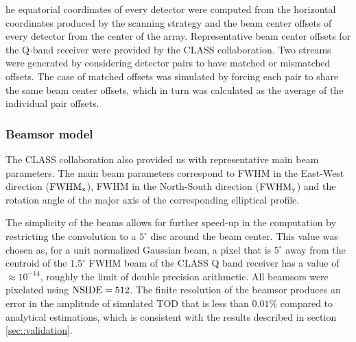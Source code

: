 \documentclass[a4paper,11pt]{article}
\begin{document}
he equatorial coordinates of every detector were computed from the horizontal coordinates produced by the scanning strategy and the beam center offsets of every detector from the center of the array.
Representative beam center offsets for the Q-band receiver were provided by the CLASS collaboration. Two streams were generated by considering detector pairs to have matched or mismatched offsets. The case of matched offsets was simulated by forcing each pair to share the same beam center offsets, which in turn was calculated as the average of the individual pair offsets. %

\subsubsection{Beamsor model}


The CLASS collaboration also provided us with representative main beam parameters. The main beam parameters correspond to FWHM in the East-West direction ($\rm{FWHM}_x$), FWHM in the North-South direction ($\rm{FWHM}_y$) and the rotation angle of the major axis of the corresponding elliptical profile. %

The simplicity of the beams allows for further speed-up in the computation by restricting the convolution to a $5^\circ$ disc around the beam center. This value was chosen as, for a unit normalized Gaussian beam, a pixel that is $5^\circ$ away from the centroid of the $1.5^{\circ}$ FWHM beam of the CLASS Q band receiver has a value of $\approx 10^{-14}$, roughly the limit of double precision arithmetic. All beamsors were pixelated using $\rm{NSIDE}=512$. The finite resolution of the beamsor produces an error in the amplitude of simulated TOD that is less than $0.01\%$ compared to analytical estimations, which is consistent with the results described in section \ref{sec::validation}.
\end{document}
